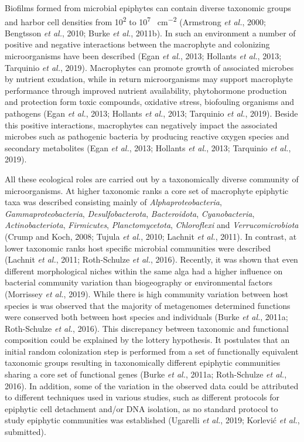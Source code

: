 \documentclass[12pt,]{article}
\begin{document}
Biofilms formed from microbial epiphytes can contain diverse taxonomic
groups and harbor cell densities from 10\textsuperscript{2} to
10\textsuperscript{7} \si{\cells\per\cm\squared} (Armstrong \emph{et
al.}, 2000; Bengtsson \emph{et al.}, 2010; Burke \emph{et al.}, 2011b).
In such an environment a number of positive and negative interactions
between the macrophyte and colonizing microorganisms have been described
(Egan \emph{et al.}, 2013; Hollants \emph{et al.}, 2013; Tarquinio
\emph{et al.}, 2019). Macrophytes can promote growth of associated
microbes by nutrient exudation, while in return microorganisms may
support macrophyte performance through improved nutrient availability,
phytohormone production and protection form toxic compounds, oxidative
stress, biofouling organisms and pathogens (Egan \emph{et al.}, 2013;
Hollants \emph{et al.}, 2013; Tarquinio \emph{et al.}, 2019). Beside
this positive interactions, macrophytes can negatively impact the
associated microbes such as pathogenic bacteria by producing reactive
oxygen species and secondary metabolites (Egan \emph{et al.}, 2013;
Hollants \emph{et al.}, 2013; Tarquinio \emph{et al.}, 2019).

All these ecological roles are carried out by a taxonomically diverse
community of microorganisms. At higher taxonomic ranks a core set of
macrophyte epiphytic taxa was described consisting mainly of
\emph{Alphaproteobacteria}, \emph{Gammaproteobacteria},
\emph{Desulfobacterota}, \emph{Bacteroidota}, \emph{Cyanobacteria},
\emph{Actinobacteriota}, \emph{Firmicutes}, \emph{Planctomycetota},
\emph{Chloroflexi} and \emph{Verrucomicrobiota} (Crump and Koch, 2008;
Tujula \emph{et al.}, 2010; Lachnit \emph{et al.}, 2011). In contrast,
at lower taxonomic ranks host specific microbial communities were
described (Lachnit \emph{et al.}, 2011; Roth-Schulze \emph{et al.},
2016). Recently, it was shown that even different morphological niches
within the same alga had a higher influence on bacterial community
variation than biogeography or environmental factors (Morrissey \emph{et
al.}, 2019). While there is high community variation between host
species is was observed that the majority of metagenomes determined
functions were conserved both between host species and individuals
(Burke \emph{et al.}, 2011a; Roth-Schulze \emph{et al.}, 2016). This
discrepancy between taxonomic and functional composition could be
explained by the lottery hypothesis. It postulates that an initial
random colonization step is performed from a set of functionally
equivalent taxonomic groups resulting in taxonomically different
epiphytic communities sharing a core set of functional genes (Burke
\emph{et al.}, 2011a; Roth-Schulze \emph{et al.}, 2016). In addition,
some of the variation in the observed data could be attributed to
different techniques used in various studies, such as different
protocols for epiphytic cell detachment and/or DNA isolation, as no
standard protocol to study epiphytic communities was established
(Ugarelli \emph{et al.}, 2019; Korlević \emph{et al.}, submitted).
\end{document}
